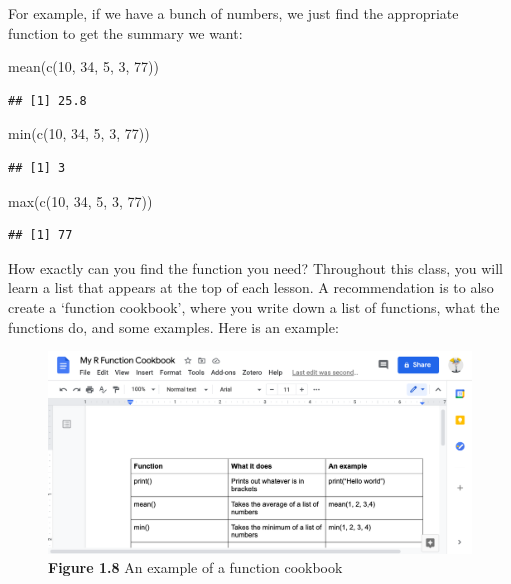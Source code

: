 \documentclass[
]{book}
\newenvironment{Shaded}{\begin{snugshade}}{\end{snugshade}}
\newcommand{\DecValTok}[1]{\textcolor[rgb]{0.00,0.00,0.81}{#1}}
\newcommand{\FunctionTok}[1]{\textcolor[rgb]{0.00,0.00,0.00}{#1}}
\newcommand{\NormalTok}[1]{#1}
\begin{document}
For example, if we have a bunch of numbers, we just find the appropriate function to get the summary we want:

\begin{Shaded}
\begin{Highlighting}[]
\FunctionTok{mean}\NormalTok{(}\FunctionTok{c}\NormalTok{(}\DecValTok{10}\NormalTok{, }\DecValTok{34}\NormalTok{, }\DecValTok{5}\NormalTok{, }\DecValTok{3}\NormalTok{, }\DecValTok{77}\NormalTok{))}
\end{Highlighting}
\end{Shaded}

\begin{verbatim}
## [1] 25.8
\end{verbatim}

\begin{Shaded}
\begin{Highlighting}[]
\FunctionTok{min}\NormalTok{(}\FunctionTok{c}\NormalTok{(}\DecValTok{10}\NormalTok{, }\DecValTok{34}\NormalTok{, }\DecValTok{5}\NormalTok{, }\DecValTok{3}\NormalTok{, }\DecValTok{77}\NormalTok{))}
\end{Highlighting}
\end{Shaded}

\begin{verbatim}
## [1] 3
\end{verbatim}

\begin{Shaded}
\begin{Highlighting}[]
\FunctionTok{max}\NormalTok{(}\FunctionTok{c}\NormalTok{(}\DecValTok{10}\NormalTok{, }\DecValTok{34}\NormalTok{, }\DecValTok{5}\NormalTok{, }\DecValTok{3}\NormalTok{, }\DecValTok{77}\NormalTok{))}
\end{Highlighting}
\end{Shaded}

\begin{verbatim}
## [1] 77
\end{verbatim}

How exactly can you find the function you need? Throughout this class, you will learn a list that appears at the top of each lesson. A recommendation is to also create a `function cookbook', where you write down a list of functions, what the functions do, and some examples. Here is an example:

\begin{figure}
\centering
\includegraphics{Images/fn_cookbook.png}
\caption{\textbf{Figure 1.8} An example of a function cookbook}
\end{figure}
\end{document}
